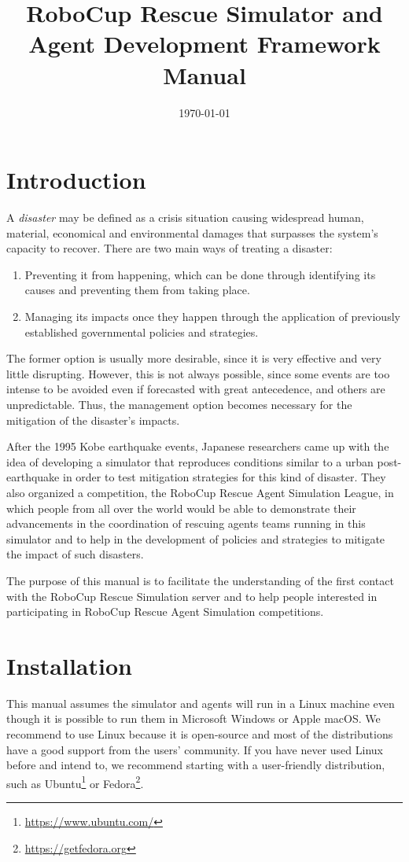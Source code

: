 \documentclass{article}
\begin{document}
\title{RoboCup Rescue Simulator and Agent Development Framework Manual}
\author{}
\date{\today}
\maketitle
\tableofcontents
\section{Introduction}
A \emph{disaster} may be defined as a crisis situation causing widespread human, material, economical and environmental damages that surpasses the system's capacity to recover. There are two main ways of treating a disaster:

\begin{enumerate}
  \item Preventing it from happening, which can be done through identifying its causes and preventing them from taking place.
  \item Managing its impacts once they happen through the application of previously established governmental policies and strategies.
\end{enumerate}

The former option is usually more desirable, since it is very effective and very little disrupting. However, this is not always possible, since some events are too intense to be avoided even if forecasted with great antecedence, and others are unpredictable. Thus, the management option becomes necessary for the mitigation of the disaster's impacts.

After the 1995 Kobe earthquake events, Japanese researchers came up with the idea of developing a simulator that reproduces conditions similar to a urban post-earthquake in order to test mitigation strategies for this kind of disaster. They also organized a competition, the RoboCup Rescue Agent Simulation League, in which people from all over the world would be able to demonstrate their advancements in the coordination of rescuing agents teams running in this simulator and to help in the development of policies and strategies to mitigate the impact of such disasters.

The purpose of this manual is to facilitate the understanding of the first contact with the RoboCup Rescue Simulation server and to help people interested in participating in RoboCup Rescue Agent Simulation competitions.
\section{Installation}
This manual assumes the simulator and agents will run in a Linux machine even though it is possible to run them in Microsoft Windows or Apple macOS. We recommend to use Linux because it is open-source and most of the distributions have a good support from the users' community. If you have never used Linux before and intend to, we recommend starting with a user-friendly distribution, such as Ubuntu\footnote{\url{https://www.ubuntu.com/}} or Fedora\footnote{\url{https://getfedora.org}}.
\end{document}
